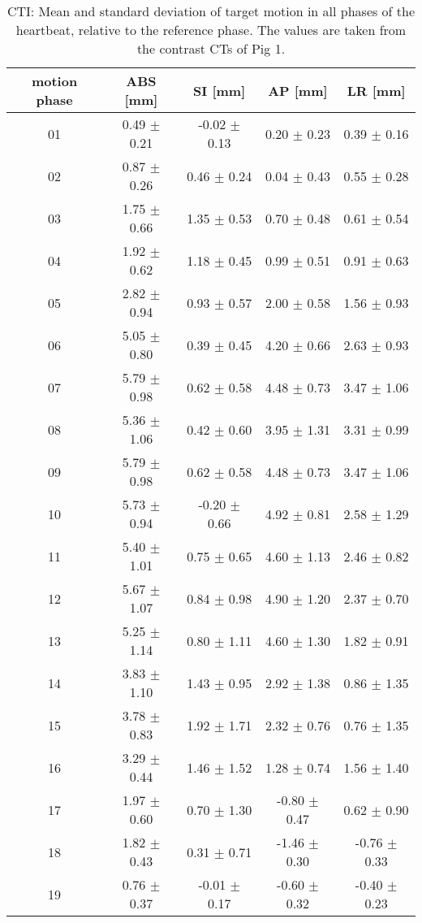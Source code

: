 \vspace*{-0.5cm}


\begin{table}[H]
  \centering
  \tiny
  \caption{CTI: Mean and standard deviation of target motion in all phases of the heartbeat, relative to the reference phase. The values are 
  taken from the contrast CTs of Pig 1.}
  \begin{tabular}{|c|c|c|c|c|}
    \hline\hline
    motion phase\rule{0pt}{2.6ex}\rule[-1.2ex]{0pt}{0pt} & ABS [mm] & SI [mm] & AP [mm] & LR [mm]\\
    \hline
01 &0.49 $\pm$ 0.21 &-0.02 $\pm$ 0.13 &0.20 $\pm$ 0.23 &0.39 $\pm$ 0.16 \\
02 &0.87 $\pm$ 0.26 &0.46 $\pm$ 0.24 &0.04 $\pm$ 0.43 &0.55 $\pm$ 0.28 \\
03 &1.75 $\pm$ 0.66 &1.35 $\pm$ 0.53 &0.70 $\pm$ 0.48 &0.61 $\pm$ 0.54 \\
04 &1.92 $\pm$ 0.62 &1.18 $\pm$ 0.45 &0.99 $\pm$ 0.51 &0.91 $\pm$ 0.63 \\
05 &2.82 $\pm$ 0.94 &0.93 $\pm$ 0.57 &2.00 $\pm$ 0.58 &1.56 $\pm$ 0.93 \\
06 &5.05 $\pm$ 0.80 &0.39 $\pm$ 0.45 &4.20 $\pm$ 0.66 &2.63 $\pm$ 0.93 \\
07 &5.79 $\pm$ 0.98 &0.62 $\pm$ 0.58 &4.48 $\pm$ 0.73 &3.47 $\pm$ 1.06 \\
08 &5.36 $\pm$ 1.06 &0.42 $\pm$ 0.60 &3.95 $\pm$ 1.31 &3.31 $\pm$ 0.99 \\
09 &5.79 $\pm$ 0.98 &0.62 $\pm$ 0.58 &4.48 $\pm$ 0.73 &3.47 $\pm$ 1.06 \\
10 &5.73 $\pm$ 0.94 &-0.20 $\pm$ 0.66 &4.92 $\pm$ 0.81 &2.58 $\pm$ 1.29 \\
11 &5.40 $\pm$ 1.01 &0.75 $\pm$ 0.65 &4.60 $\pm$ 1.13 &2.46 $\pm$ 0.82 \\
12 &5.67 $\pm$ 1.07 &0.84 $\pm$ 0.98 &4.90 $\pm$ 1.20 &2.37 $\pm$ 0.70 \\
13 &5.25 $\pm$ 1.14 &0.80 $\pm$ 1.11 &4.60 $\pm$ 1.30 &1.82 $\pm$ 0.91 \\
14 &3.83 $\pm$ 1.10 &1.43 $\pm$ 0.95 &2.92 $\pm$ 1.38 &0.86 $\pm$ 1.35 \\
15 &3.78 $\pm$ 0.83 &1.92 $\pm$ 1.71 &2.32 $\pm$ 0.76 &0.76 $\pm$ 1.35 \\
16 &3.29 $\pm$ 0.44 &1.46 $\pm$ 1.52 &1.28 $\pm$ 0.74 &1.56 $\pm$ 1.40 \\
17 &1.97 $\pm$ 0.60 &0.70 $\pm$ 1.30 &-0.80 $\pm$ 0.47 &0.62 $\pm$ 0.90 \\
18 &1.82 $\pm$ 0.43 &0.31 $\pm$ 0.71 &-1.46 $\pm$ 0.30 &-0.76 $\pm$ 0.33 \\
19 &0.76 $\pm$ 0.37 &-0.01 $\pm$ 0.17 &-0.60 $\pm$ 0.32 &-0.40 $\pm$ 0.23 \\
    \hline\hline
  \end{tabular}
  \label{tab:motion:CTI:Pig1}
\end{table}

